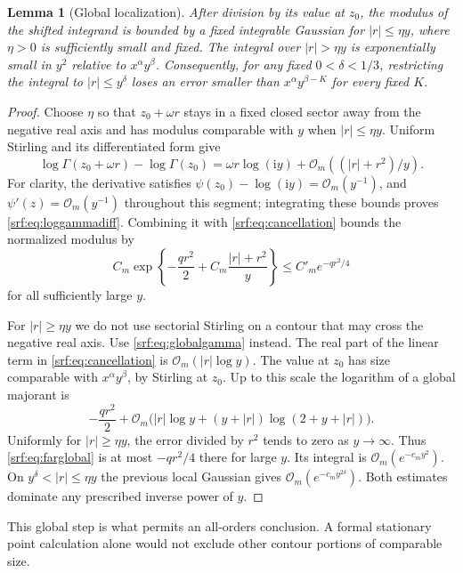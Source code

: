 \documentclass[11pt]{article}
\newtheorem{lemma}[theorem]{Lemma}
\theoremstyle{remark}\newtheorem{remark}[theorem]{Remark}
\newcommand{\OO}{\mathcal O}
\newcommand{\ii}{\mathrm i}
\begin{document}
\begin{lemma}[Global localization]\label{srf:lem:localization}
After division by its value at $z_0$, the modulus of the shifted integrand is bounded by a fixed integrable Gaussian for $|r|\le\eta y$, where $\eta>0$ is sufficiently small and fixed. The integral over $|r|>\eta y$ is exponentially small in $y^2$ relative to $x^\alpha y^\beta$. Consequently, for any fixed $0<\delta<1/3$, restricting the integral to $|r|\le y^\delta$ loses an error smaller than $x^\alpha y^{\beta-K}$ for every fixed $K$.
\end{lemma}
\begin{proof}
Choose $\eta$ so that $z_0+\omega r$ stays in a fixed closed sector away from the negative real axis and has modulus comparable with $y$ when $|r|\le\eta y$. Uniform Stirling and its differentiated form give
\begin{equation}\label{srf:eq:loggammadiff}
 \log\Gamma(z_0+\omega r)-\log\Gamma(z_0)
   =\omega r\log(\ii y)+\OO_m((|r|+r^2)/y).
\end{equation}
For clarity, the derivative satisfies
$\psi(z_0)-\log(\ii y)=\OO_m(y^{-1})$, and $\psi'(z)=\OO_m(y^{-1})$ throughout this segment; integrating these bounds proves \eqref{srf:eq:loggammadiff}. Combining it with \eqref{srf:eq:cancellation} bounds the normalized modulus by
\[
 C_m\exp\left\{-\frac{qr^2}{2}+C_m\frac{|r|+r^2}{y}\right\}
 \le C'_m e^{-qr^2/4}
\]
for all sufficiently large $y$.

For $|r|\ge\eta y$ we do not use sectorial Stirling on a contour that may cross the negative real axis. Use \eqref{srf:eq:globalgamma} instead. The real part of the linear term in \eqref{srf:eq:cancellation} is $\OO_m(|r|\log y)$. The value at $z_0$ has size comparable with $x^\alpha y^\beta$, by Stirling at $z_0$. Up to this scale the logarithm of a global majorant is
\begin{equation}\label{srf:eq:farglobal}
 -\frac{qr^2}{2}
 +\OO_m\bigl(|r|\log y+(y+|r|)\log(2+y+|r|)\bigr).
\end{equation}
Uniformly for $|r|\ge\eta y$, the error divided by $r^2$ tends to zero as $y\to\infty$. Thus \eqref{srf:eq:farglobal} is at most $-qr^2/4$ there for large $y$. Its integral is $\OO_m(e^{-c_my^2})$. On $y^\delta<|r|\le\eta y$ the previous local Gaussian gives $\OO_m(e^{-c_my^{2\delta}})$. Both estimates dominate any prescribed inverse power of $y$.
\end{proof}

This global step is what permits an all-orders conclusion. A formal stationary point calculation alone would not exclude other contour portions of comparable size.
\end{document}
